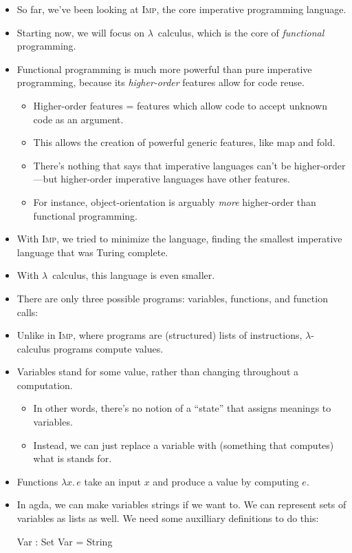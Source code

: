 \documentclass{lecturenotes}
\newcommand{\abs}[2]{\ensuremath{\lambda #1.\,#2}}
\newcommand{\app}[2]{\ensuremath{#1\;#2}}
\begin{document}
\begin{itemize}
\item So far, we've been looking at \textsc{Imp}, the core imperative programming language.
\item Starting now, we will focus on $\lambda$~calculus, which is the core of \emph{functional} programming.
\item Functional programming is much more powerful than pure imperative programming, because its \emph{higher-order} features allow for code reuse.
  \begin{itemize}
  \item Higher-order features = features which allow code to accept unknown code as an argument.
  \item This allows the creation of powerful generic features, like \textsf{map} and \textsf{fold}.
  \item There's nothing that says that imperative languages can't be higher-order---but higher-order imperative languages have other features.
  \item For instance, object-orientation is arguably \emph{more} higher-order than functional programming.
  \end{itemize}
\item With \textsc{Imp}, we tried to minimize the language, finding the smallest imperative language that was Turing complete.
\item With $\lambda$~calculus, this language is even smaller.
\item There are only three possible programs: variables, functions, and function calls:
  \begin{syntax}
      \alternative{\abs{x}{e}}
      \alternative{\app{e_1}{e_2}}
  \end{syntax}
\item Unlike in \textsc{Imp}, where programs are (structured) lists of instructions, $\lambda$-calculus programs compute values.
\item Variables stand for some value, rather than changing throughout a computation.
  \begin{itemize}
  \item In other words, there's no notion of a ``state'' that assigns meanings to variables.
  \item Instead, we can just replace a variable with (something that computes) what is stands for.
  \end{itemize}
\item Functions $\abs{x}{e}$ take an input $x$ and produce a value by computing $e$.
\item In agda, we can make variables strings if we want to.
  We can represent sets of variables as lists as well.
  We need some auxilliary definitions to do this:
\begin{code}
Var : Set
Var = String


\end{code}
\end{itemize}
\end{document}
